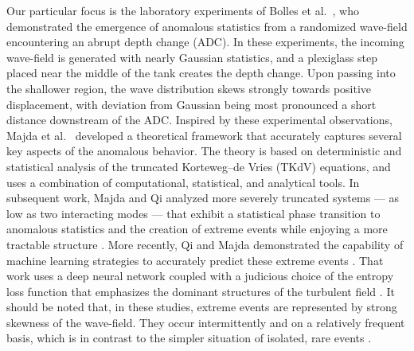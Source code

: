 \documentclass[11pt]{article}
\begin{document}
Our particular focus is the laboratory experiments of Bolles et al.~\cite{bolles2019}, who demonstrated the emergence of anomalous statistics from a randomized wave-field encountering an abrupt depth change (ADC). In these experiments, the incoming wave-field is generated with nearly Gaussian statistics, and a plexiglass step placed near the middle of the tank creates the depth change. Upon passing into the shallower region, the wave distribution skews strongly towards positive displacement, with deviation from Gaussian being most pronounced a short distance downstream of the ADC. Inspired by these experimental observations, Majda et al.~\cite{majda2019} developed a theoretical framework that accurately captures several key aspects of the anomalous behavior. The theory is based on deterministic and statistical analysis of the truncated Korteweg–de Vries (TKdV) equations, and uses a combination of computational, statistical, and analytical tools. In subsequent work, Majda and Qi analyzed more severely truncated systems --- as low as two interacting modes --- that exhibit a statistical phase transition to anomalous statistics and the creation of extreme events while enjoying a more tractable structure \cite{majdaqi2019}. More recently, Qi and Majda demonstrated the capability of machine learning strategies to accurately predict these extreme events \cite{MachineLearning2019}. That work uses a deep neural network coupled with a judicious choice of the entropy loss function that emphasizes the dominant structures of the turbulent field \cite{MachineLearning2019}. It should be noted that, in these studies, extreme events are represented by strong skewness of the wave-field. They occur intermittently and on a relatively frequent basis, which is in contrast to the simpler situation of isolated, rare events \cite{guth2019machine}.
\end{document}
